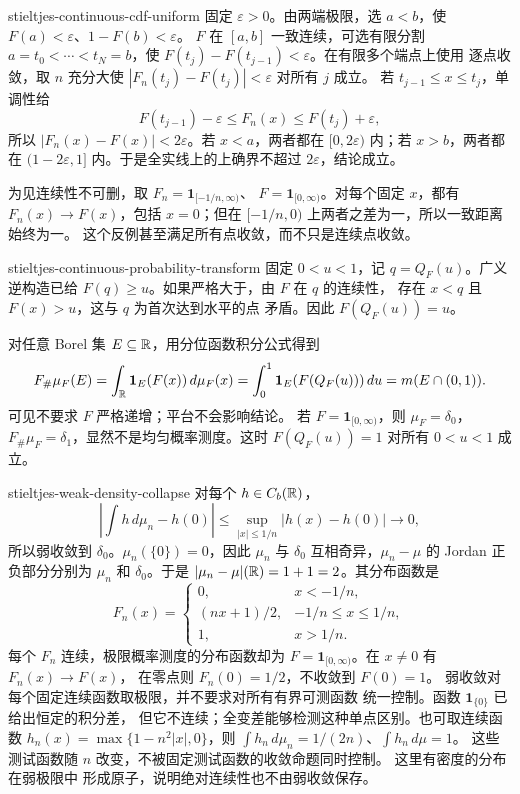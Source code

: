 \begin{solution}{stieltjes-continuous-cdf-uniform}
固定 \(\varepsilon>0\)。由两端极限，选 \(a<b\)，使
\(F(a)<\varepsilon\)、\(1-F(b)<\varepsilon\)。
\(F\) 在 \([a,b]\) 一致连续，可选有限分割
\(a=t_0<\cdots<t_N=b\)，使
\(F(t_j)-F(t_{j-1})<\varepsilon\)。在有限多个端点上使用
逐点收敛，取 \(n\) 充分大使
\(|F_n(t_j)-F(t_j)|<\varepsilon\) 对所有 \(j\) 成立。
若 \(t_{j-1}\le x\le t_j\)，单调性给
\[
 F(t_{j-1})-\varepsilon\le F_n(x)
 \le F(t_j)+\varepsilon,
\]
所以 \(|F_n(x)-F(x)|<2\varepsilon\)。若 \(x<a\)，两者都在
\([0,2\varepsilon)\) 内；若 \(x>b\)，两者都在
\((1-2\varepsilon,1]\) 内。于是全实线上的上确界不超过
\(2\varepsilon\)，结论成立。

为见连续性不可删，取 \(F_n=\mathbf1_{[-1/n,\infty)}\)、
\(F=\mathbf1_{[0,\infty)}\)。对每个固定 \(x\)，都有
\(F_n(x)\to F(x)\)，包括 \(x=0\)；但在
\([-1/n,0)\) 上两者之差为一，所以一致距离始终为一。
这个反例甚至满足所有点收敛，而不只是连续点收敛。
\end{solution}

\begin{solution}{stieltjes-continuous-probability-transform}
固定 \(0<u<1\)，记 \(q=Q_F(u)\)。广义逆构造已给
\(F(q)\ge u\)。如果严格大于，由 \(F\) 在 \(q\) 的连续性，
存在 \(x<q\) 且 \(F(x)>u\)，这与 \(q\) 为首次达到水平的点
矛盾。因此 \(F(Q_F(u))=u\)。

对任意 Borel 集 \(E\subseteq\mathbb{R}\)，用分位函数积分公式得到
\[
 F_\#\mu_F(E)
 =\int_{\mathbb{R}}\mathbf1_E(F(x))\,d\mu_F(x)
 =\int_0^1\mathbf1_E(F(Q_F(u)))\,du
 =m(E\cap(0,1)).
\]
可见不要求 \(F\) 严格递增；平台不会影响结论。
若 \(F=\mathbf1_{[0,\infty)}\)，则 \(\mu_F=\delta_0\)，
\(F_\#\mu_F=\delta_1\)，显然不是均匀概率测度。这时
\(F(Q_F(u))=1\) 对所有 \(0<u<1\) 成立。
\end{solution}

\begin{solution}{stieltjes-weak-density-collapse}
对每个 \(h\in C_b(\mathbb{R})\)，
\[
 \left|\int h\,d\mu_n-h(0)\right|
 \le\sup_{|x|\le1/n}|h(x)-h(0)|\longrightarrow0,
\]
所以弱收敛到 \(\delta_0\)。\(\mu_n(\{0\})=0\)，因此
\(\mu_n\) 与 \(\delta_0\) 互相奇异，\(\mu_n-\mu\) 的 Jordan
正负部分分别为 \(\mu_n\) 和 \(\delta_0\)。于是
\(|\mu_n-\mu|(\mathbb{R})=1+1=2\)。其分布函数是
\[
 F_n(x)=\begin{cases}
 0,&x<-1/n,\\
 (nx+1)/2,&-1/n\le x\le1/n,\\
 1,&x>1/n.
 \end{cases}
\]
每个 \(F_n\) 连续，极限概率测度的分布函数却为
\(F=\mathbf1_{[0,\infty)}\)。在 \(x\ne0\) 有 \(F_n(x)\to F(x)\)，
在零点则 \(F_n(0)=1/2\)，不收敛到 \(F(0)=1\)。
弱收敛对每个固定连续函数取极限，并不要求对所有有界可测函数
统一控制。函数 \(\mathbf1_{\{0\}}\) 已给出恒定的积分差，
但它不连续；全变差能够检测这种单点区别。也可取连续函数
\(h_n(x)=\max\{1-n^2|x|,0\}\)，则
\(\int h_n\,d\mu_n=1/(2n)\)、\(\int h_n\,d\mu=1\)。
这些测试函数随 \(n\) 改变，不被固定测试函数的收敛命题同时控制。
这里有密度的分布在弱极限中
形成原子，说明绝对连续性也不由弱收敛保存。
\end{solution}

